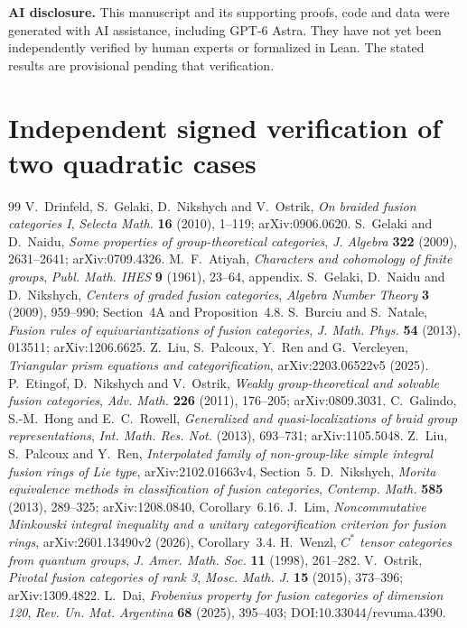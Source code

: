 \documentclass[11pt]{article}
\begin{document}
\medskip\noindent\textbf{AI disclosure.}
This manuscript and its supporting proofs, code and data were generated
with AI assistance, including GPT-6 Astra. They have not yet been
independently verified by human experts or formalized in Lean.
The stated results are provisional pending that verification.

\appendix
\section{Independent signed verification of two quadratic cases}
\label{app:signed-independent}



\begin{thebibliography}{99}
 V.~Drinfeld, S.~Gelaki, D.~Nikshych and V.~Ostrik,
\emph{On braided fusion categories I},
\emph{Selecta Math.} \textbf{16} (2010), 1--119; arXiv:0906.0620.
 S.~Gelaki and D.~Naidu,
\emph{Some properties of group-theoretical categories},
\emph{J. Algebra} \textbf{322} (2009), 2631--2641; arXiv:0709.4326.
 M.~F.~Atiyah, \emph{Characters and cohomology of finite groups},
\emph{Publ. Math. IHES} \textbf{9} (1961), 23--64, appendix.
 S.~Gelaki, D.~Naidu and D.~Nikshych,
\emph{Centers of graded fusion categories},
\emph{Algebra Number Theory} \textbf{3} (2009), 959--990;
Section~4A and Proposition~4.8.
 S.~Burciu and S.~Natale,
\emph{Fusion rules of equivariantizations of fusion categories},
\emph{J. Math. Phys.} \textbf{54} (2013), 013511; arXiv:1206.6625.
 Z.~Liu, S.~Palcoux, Y.~Ren and G.~Vercleyen,
\emph{Triangular prism equations and categorification},
arXiv:2203.06522v5 (2025).
 P.~Etingof, D.~Nikshych and V.~Ostrik,
\emph{Weakly group-theoretical and solvable fusion categories},
\emph{Adv. Math.} \textbf{226} (2011), 176--205; arXiv:0809.3031.
 C.~Galindo, S.-M.~Hong and E.~C.~Rowell,
\emph{Generalized and quasi-localizations of braid group representations},
\emph{Int. Math. Res. Not.} (2013), 693--731; arXiv:1105.5048.
 Z.~Liu, S.~Palcoux and Y.~Ren,
\emph{Interpolated family of non-group-like simple integral fusion rings
of Lie type}, arXiv:2102.01663v4, Section~5.
 D.~Nikshych,
\emph{Morita equivalence methods in classification of fusion categories},
\emph{Contemp. Math.} \textbf{585} (2013), 289--325;
arXiv:1208.0840, Corollary~6.16.
 J.~Lim, \emph{Noncommutative Minkowski integral inequality and a unitary categorification criterion for fusion rings}, arXiv:2601.13490v2 (2026), Corollary~3.4.
 H.~Wenzl, \emph{$C^*$ tensor categories from quantum groups},
\emph{J. Amer. Math. Soc.} \textbf{11} (1998), 261--282.
 V.~Ostrik, \emph{Pivotal fusion categories of rank 3},
\emph{Mosc. Math. J.} \textbf{15} (2015), 373--396; arXiv:1309.4822.
 L.~Dai, \emph{Frobenius property for fusion categories
of dimension 120}, \emph{Rev. Un. Mat. Argentina} \textbf{68} (2025),
395--403; DOI:10.33044/revuma.4390.


\end{thebibliography}
\end{document}
